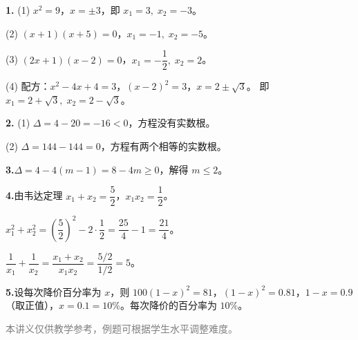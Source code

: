 \documentclass[12pt, a4paper]{ctexart}
\begin{document}
\vspace{6pt}
\begin{knowledgebox}[参考答案]
\textbf{1.}\quad
(1)\; $x^2=9$，$x=\pm 3$，即 $x_1=3,\; x_2=-3$。

(2)\; $(x+1)(x+5)=0$，$x_1=-1,\; x_2=-5$。

(3)\; $(2x+1)(x-2)=0$，$x_1=-\dfrac{1}{2},\; x_2=2$。

(4)\; 配方：$x^2-4x+4=3$，$(x-2)^2=3$，$x=2\pm\sqrt{3}$。
即 $x_1=2+\sqrt{3},\; x_2=2-\sqrt{3}$。

\medskip
\textbf{2.}\quad
(1)\; $\Delta = 4-20 = -16 < 0$，方程没有实数根。

(2)\; $\Delta = 144-144 = 0$，方程有两个相等的实数根。

\medskip
\textbf{3.}\quad $\Delta = 4-4(m-1) = 8-4m \geqslant 0$，解得 $m \leqslant 2$。

\medskip
\textbf{4.}\quad 由韦达定理 $x_1+x_2=\dfrac{5}{2}$，$x_1 x_2=\dfrac{1}{2}$。

$x_1^2+x_2^2 = \left(\dfrac{5}{2}\right)^2 - 2\cdot\dfrac{1}{2} = \dfrac{25}{4}-1 = \dfrac{21}{4}$。

$\dfrac{1}{x_1}+\dfrac{1}{x_2} = \dfrac{x_1+x_2}{x_1 x_2} = \dfrac{5/2}{1/2} = 5$。

\medskip
\textbf{5.}\quad 设每次降价百分率为 $x$，则 $100(1-x)^2=81$，$(1-x)^2=0.81$，$1-x=0.9$（取正值），$x=0.1=10\%$。每次降价的百分率为 $10\%$。
\end{knowledgebox}

\vfill
\begin{center}
\small\textcolor{gray}{本讲义仅供教学参考，例题可根据学生水平调整难度。}
\end{center}
\end{document}
